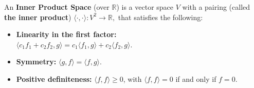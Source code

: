 \documentclass[12pt,letterpaper]{article}
\begin{document}
\begin{defn}
	An \textbf{Inner Product Space} (over $\mathbb{R}$) is a vector space $V$ with a pairing (called \textbf{the inner product}) $\langle\cdot,\cdot\rangle:V^2 \rightarrow \mathbb{R},$ that satisfies the following: 
	
	\begin{itemize}
		\item \textbf{Linearity in the first factor:}\\ $\langle  c_1 f_1 + c_2 f_2, g\rangle = c_1 \langle f_1, g\rangle + c_2 \langle f_2, g\rangle$.		
		\item \textbf{Symmetry:} $\langle g, f\rangle = \langle f, g\rangle$.
		
		\item \textbf{Positive definiteness:} $\langle f, f\rangle \geq 0$, 
		with $\langle f, f\rangle = 0$ if and only if $f = 0.$
		
		
	\end{itemize}
\end{defn}
\end{document}
